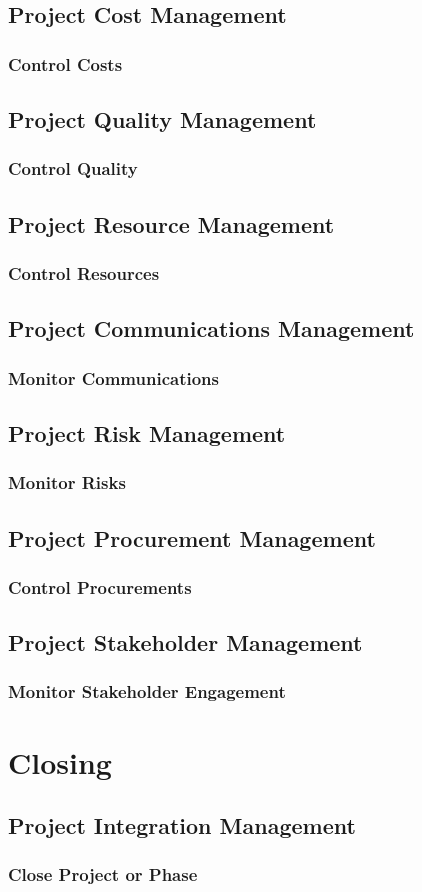 \documentclass[12pt,letterpaper]{report}
\begin{document}
	\chapter{Project Cost Management}
	\section{Control Costs}
	\chapter{Project Quality Management}
	\section{Control Quality}
	\chapter{Project Resource Management}
	\section{Control Resources}
	\chapter{Project Communications Management}
	\section{Monitor Communications}
	\chapter{Project Risk Management}
	\section{Monitor Risks}
	\chapter{Project Procurement Management}
	\section{Control Procurements}
	\chapter{Project Stakeholder Management}
	\section{Monitor Stakeholder Engagement}
	
	
	\part{Closing}
	\chapter{Project Integration Management}
	\section{Close Project or Phase}
	
\end{document}
